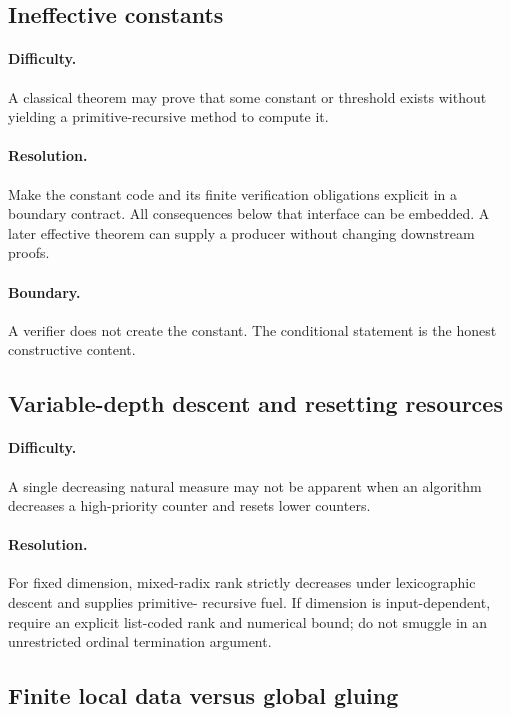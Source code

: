 \subsection{Ineffective constants}

\paragraph{Difficulty.}
A classical theorem may prove that some constant or threshold exists without yielding a primitive-recursive
method to compute it.

\paragraph{Resolution.}
Make the constant code and its finite verification obligations explicit in a boundary contract.  All
consequences below that interface can be embedded.  A later effective theorem can supply a producer without
changing downstream proofs.

\paragraph{Boundary.}
A verifier does not create the constant.  The conditional statement is the honest constructive content.

\subsection{Variable-depth descent and resetting resources}

\paragraph{Difficulty.}
A single decreasing natural measure may not be apparent when an algorithm decreases a high-priority
counter and resets lower counters.

\paragraph{Resolution.}
For fixed dimension, mixed-radix rank strictly decreases under lexicographic descent and supplies primitive-
recursive fuel.  If dimension is input-dependent, require an explicit list-coded rank and numerical bound;
do not smuggle in an unrestricted ordinal termination argument.

\subsection{Finite local data versus global gluing}

